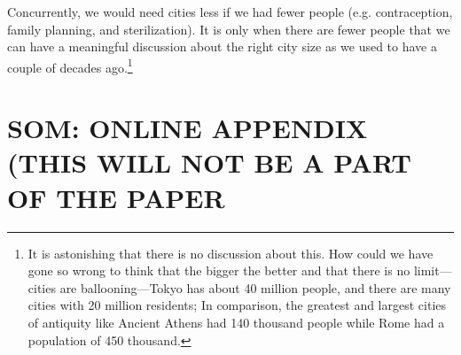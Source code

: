 \documentclass[10pt, letterpaper]{article}
\begin{document}
Concurrently, we would need cities less if we had fewer people
(e.g. contraception, family planning, and sterilization). It is only when there are fewer people that we can have a meaningful discussion about the right city size as we used to have a couple of decades ago.\footnote{It is astonishing that there is no discussion about this. How could we have gone so wrong to think that the bigger the better and that there is no limit---cities are ballooning---Tokyo has about 40 million people, and there are many cities with 20 million residents; In comparison, the greatest and largest cities of antiquity like Ancient Athens had 140 thousand people while Rome had a population of 450 thousand.} 










\section*{SOM: ONLINE APPENDIX (THIS WILL NOT BE A PART OF THE PAPER}
\end{document}
